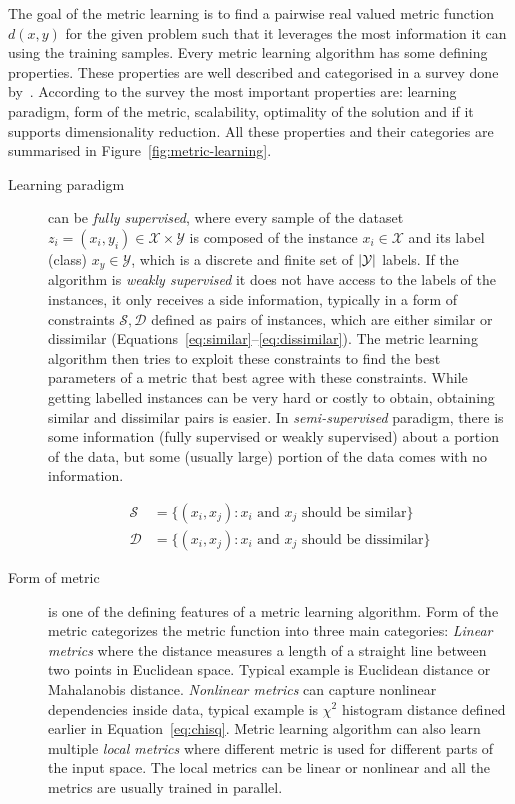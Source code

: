 \documentclass[12pt,a4paper]{report}
\begin{document}
The goal of the metric learning is to find a pairwise real valued metric function $d(x,y)$ for the given problem such that it leverages the most information it can using the training samples. Every metric learning algorithm has some defining properties. These properties are well described and categorised in a survey done by~\citep{bellet2013survey}. According to the survey the most important properties are: learning paradigm, form of the metric, scalability, optimality of the solution and if it supports dimensionality reduction. All these properties and their categories are summarised in Figure~\ref{fig:metric-learning}.


\begin{description}
\item [Learning paradigm] can be \textit{fully supervised}, where every sample of the dataset $z_i=(x_i,y_i) \in \mathcal{X} \times \mathcal{Y}$ is composed of the instance $x_i \in \mathcal{X}$ and its label (class) $x_y \in \mathcal{Y}$, which is a discrete and finite set of $\left|{\mathcal{Y}}\right|$ labels. If the algorithm is \textit{weakly supervised} it does not have access to the labels of the instances, it only receives a side information, typically in a form of constraints $\mathcal{S}, \mathcal{D}$ defined as pairs of instances, which are either similar or dissimilar (Equations~\ref{eq:similar}--\ref{eq:dissimilar}). The metric learning algorithm then tries to exploit these constraints to find the best parameters of a metric that best agree with these constraints. While getting labelled instances can be very hard or costly to obtain, obtaining similar and dissimilar pairs is easier. In \textit{semi-supervised} paradigm, there is some information (fully supervised or weakly supervised) about a portion of the data, but some (usually large) portion of the data comes with no information.

\begin{align}
\mathcal{S} &= \lbrace(x_i,x_j): x_i \text{ and } x_j \text{ should be similar} \rbrace \label{eq:similar} \\
\mathcal{D} &= \lbrace(x_i,x_j): x_i \text{ and } x_j \text{ should be dissimilar} \rbrace \label{eq:dissimilar}
\end{align}

\item [Form of metric] is one of the defining features of a metric learning algorithm. Form of the metric categorizes the metric function into three main categories: \textit{Linear metrics} where the distance measures a length of a straight line between two points in Euclidean space. Typical example is Euclidean distance or Mahalanobis distance. \textit{Nonlinear metrics} can capture nonlinear dependencies inside data, typical example is $\chi^2$ histogram distance defined earlier in Equation~\ref{eq:chisq}. Metric learning algorithm can also learn multiple \textit{local metrics} where different metric is used for different parts of the input space. The local metrics can be linear or nonlinear and all the metrics are usually trained in parallel.


\end{description}
\end{document}
